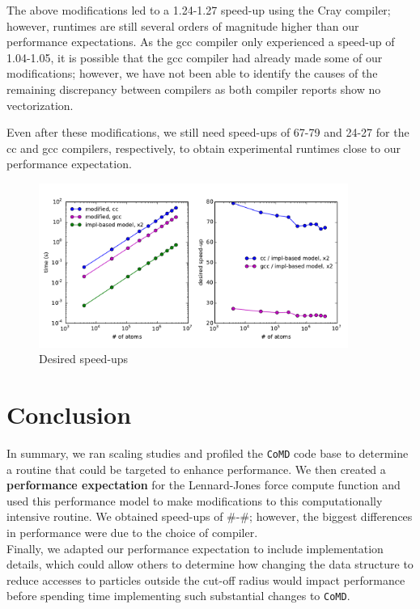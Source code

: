 \documentclass[12pt]{article}
\begin{document}
\noindent The above modifications led to a 1.24-1.27 speed-up using the Cray
compiler; however, runtimes are still several orders of magnitude higher than our
performance expectations. As the gcc compiler only experienced a speed-up of 1.04-1.05, 
it is possible that the gcc compiler had already made some of our modifications;
however, we have not been able to identify the causes of the remaining discrepancy 
between compilers as both compiler reports show no vectorization.

\noindent Even after these modifications, we still need speed-ups of 67-79 and
 24-27 for the cc and gcc compilers, respectively, to obtain experimental 
 runtimes close to our performance expectation.

\begin{figure}[h!]
  \centering
  \includegraphics[width=0.9\textwidth]{../figs/futurework_forceLJ.pdf}
  \caption{Desired speed-ups}
\end{figure}

\section{Conclusion}
\noindent In summary, we ran scaling studies and profiled the \texttt{CoMD} code base to 
determine a routine that could be targeted to enhance performance. We then created a 
{\bf performance expectation} for the Lennard-Jones force compute function and used this performance 
model to make modifications to this computationally intensive routine. We obtained speed-ups of
\#-\#; however, the biggest differences in performance were due to the choice of compiler. \\
Finally, we adapted our performance expectation to include implementation details, which could allow 
others to determine how changing the data structure to reduce accesses to particles outside 
the cut-off radius would impact performance before spending time implementing such substantial changes 
to \texttt{CoMD}.
\end{document}

